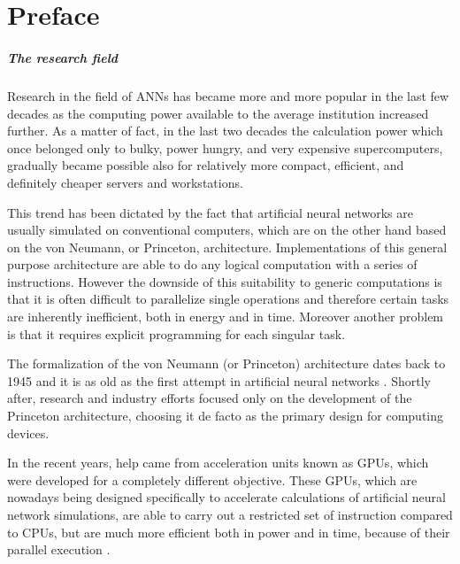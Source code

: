 \chapter*{Preface}

\paragraph{The research field\\}
Research in the field of \acp{ANN} has became more and more popular in the last few decades as the computing power available to the average institution increased further.
As a matter of fact, in the last two decades the calculation power which once belonged only to bulky, power hungry, and very expensive supercomputers, gradually became possible also for relatively more compact, efficient, and definitely cheaper servers and workstations.

This trend has been dictated by the fact that artificial neural networks are usually simulated on conventional computers, which are on the other hand based on the von Neumann, or Princeton, architecture.
Implementations of this general purpose architecture are able to do any logical computation with a series of instructions.
However the downside of this suitability to generic computations is that it is often difficult to parallelize single operations and therefore certain tasks are inherently inefficient, both in energy and in time.
Moreover another problem is that it requires explicit programming for each singular task.

The formalization of the von Neumann (or Princeton) architecture dates back to 1945 \cite{Godfrey1993} and it is as old as the first attempt in artificial neural networks \cite{Rosenblatt1958}.
Shortly after, research and industry efforts focused only on the development of the Princeton architecture, choosing it de facto as the primary design for computing devices.

In the recent years, help came from acceleration units known as \acp{GPU}, which were developed for a completely different objective.
These GPUs, which are nowadays being designed specifically to accelerate calculations of artificial neural network simulations, are able to carry out a restricted set of instruction compared to \acsp{CPU}, but are much more efficient both in power and in time, because of their parallel execution \cite{stone2010opencl,DBLP:journals/corr/abs-1211-5590}.

